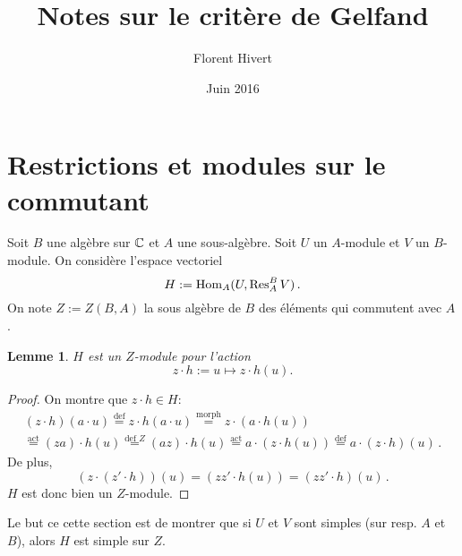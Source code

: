 \documentclass[francais,a4paper,11pt,reqno]{amsart}
\title{Notes sur le critère de Gelfand}
\author{Florent Hivert}
\date{Juin 2016}
\theoremstyle{plain}
\newtheorem{LEMME}[THEO]{\bf Lemme}
\theoremstyle{definition}
\theoremstyle{remark}
\newcommand{\act}{\cdot}
\newcommand\eqcom[1]{\mathrel{\overset{\text{#1}}{=}}}
\begin{document}
\maketitle

\section{Restrictions et modules sur le commutant}

Soit $B$ une algèbre sur ${\mathbb C}$ et $A$ une sous-algèbre. Soit $U$ un $A$-module
et $V$ un $B$-module. On considère l'espace vectoriel
\begin{equation}
H := \operatorname{Hom}_A(U, \operatorname{Res}^B_A V)\,.
\end{equation}
On note $Z := Z(B, A)$ la sous algèbre de $B$ des éléments qui commutent avec
$A$.
\begin{LEMME}
  $H$ est un $Z$-module pour l'action
  \begin{equation}
    z\act h := u\mapsto z \act h(u).
  \end{equation}
\end{LEMME}
\begin{proof}
  On montre que $z\act h\in H$:
  \begin{multline}
    (z\act h)(a\act u) \eqcom{def} z\act h(a\act u)
    \eqcom{morph} z\act (a \act h(u)) \\
    \eqcom{act}(za)\act h(u)
    \eqcom{def $Z$}(az)\act h(u)
    \eqcom{act}a\act(z\act h(u))
    \eqcom{def}a\act(z\act h)(u)\,.
  \end{multline}
  De plus,
  \begin{equation}
    (z\act (z'\act h))(u) = (zz'\act h(u)) = (zz'\act h)(u)\,.
  \end{equation}
  $H$ est donc bien un $Z$-module.
\end{proof}
Le but ce cette section est de montrer que si $U$ et $V$ sont simples (sur
resp. $A$ et $B$), alors $H$ est simple sur $Z$.
\end{document}
